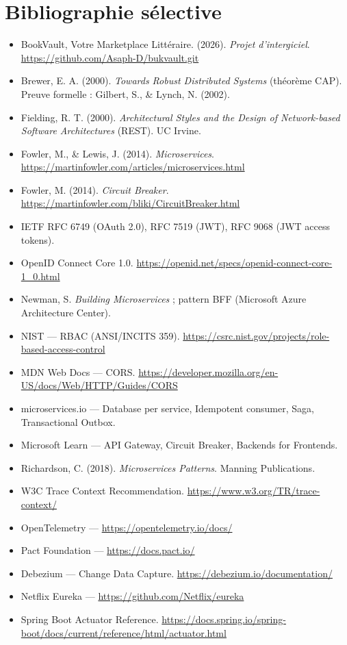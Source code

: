 \documentclass[12pt,a4paper]{report}
\begin{document}
\chapter*{Bibliographie sélective}
\begin{itemize}
  \item BookVault, Votre Marketplace Littéraire. (2026). \textit{Projet d'intergiciel}. \url{https://github.com/Asaph-D/bukvault.git}
  \item Brewer, E. A. (2000). \textit{Towards Robust Distributed Systems} (théorème CAP). Preuve formelle : Gilbert, S., \& Lynch, N. (2002).
  \item Fielding, R. T. (2000). \textit{Architectural Styles and the Design of Network-based Software Architectures} (REST). UC Irvine.
  \item Fowler, M., \& Lewis, J. (2014). \textit{Microservices}. \url{https://martinfowler.com/articles/microservices.html}
  \item Fowler, M. (2014). \textit{Circuit Breaker}. \url{https://martinfowler.com/bliki/CircuitBreaker.html}
  \item IETF RFC 6749 (OAuth 2.0), RFC 7519 (JWT), RFC 9068 (JWT access tokens).
  \item OpenID Connect Core 1.0. \url{https://openid.net/specs/openid-connect-core-1_0.html}
  \item Newman, S. \textit{Building Microservices} ; pattern BFF (Microsoft Azure Architecture Center).
  \item NIST — RBAC (ANSI/INCITS 359). \url{https://csrc.nist.gov/projects/role-based-access-control}
  \item MDN Web Docs — CORS. \url{https://developer.mozilla.org/en-US/docs/Web/HTTP/Guides/CORS}
  \item microservices.io — Database per service, Idempotent consumer, Saga, Transactional Outbox.
  \item Microsoft Learn — API Gateway, Circuit Breaker, Backends for Frontends.
  \item Richardson, C. (2018). \textit{Microservices Patterns}. Manning Publications.
  \item W3C Trace Context Recommendation. \url{https://www.w3.org/TR/trace-context/}
  \item OpenTelemetry — \url{https://opentelemetry.io/docs/}
  \item Pact Foundation — \url{https://docs.pact.io/}
  \item Debezium — Change Data Capture. \url{https://debezium.io/documentation/}
  \item Netflix Eureka — \url{https://github.com/Netflix/eureka}
  \item Spring Boot Actuator Reference. \url{https://docs.spring.io/spring-boot/docs/current/reference/html/actuator.html}
\end{itemize}
\end{document}
